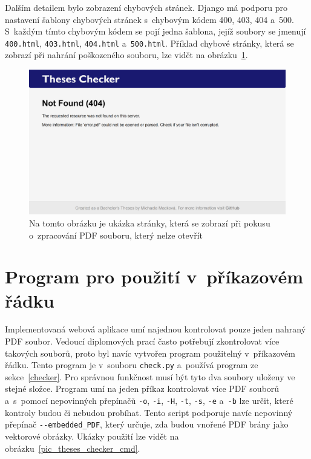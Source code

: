 Dalším detailem bylo zobrazení chybových stránek. Django má podporu pro nastavení
šablony chybových stránek s~chybovým kódem 400, 403, 404 a~500. S~každým tímto
chybovým kódem se pojí jedna šablona, jejíž soubory se jmenují \texttt{400.html},
\texttt{403.html}, \texttt{404.html} a~\texttt{500.html}. Příklad chybové
stránky, která se zobrazí při nahrání poškozeného souboru, lze vidět na
obrázku~\ref{pic_theses_checker_error}.

\begin{figure}[H]
    \centering
    \includegraphics[width=\linewidth]{obrazky-figures/screenshot-error.png}
    \caption{
        Na tomto obrázku je ukázka stránky, která se zobrazí při pokusu o~zpracování
        PDF souboru, který nelze otevřít
    }
    \label{pic_theses_checker_error}
\end{figure}



\section{Program pro použití v~příkazovém řádku}

Implementovaná webová aplikace umí najednou kontrolovat pouze jeden nahraný PDF
soubor. Vedoucí diplomových prací často potřebují zkontrolovat více takových
souborů, proto byl navíc vytvořen program použitelný v~příkazovém řádku. 
Tento program je v~souboru \texttt{check.py} a~používá program ze
sekce~\ref{checker}. Pro správnou funkčnost musí být tyto dva soubory uloženy ve
stejné složce. Program umí na jeden příkaz kontrolovat více PDF souborů
a~s~pomocí nepovinných přepínačů \texttt{-o}, \texttt{-i}, \texttt{-H}, 
\texttt{-t}, \texttt{-s}, \texttt{-e} a~\texttt{-b} lze určit, které kontroly
budou či nebudou probíhat. Tento script podporuje navíc nepovinný přepínač
\texttt{-{-}embedded\_PDF}, který určuje, zda budou vnořené PDF brány jako
vektorové obrázky. Ukázky použití lze vidět na 
obrázku~\ref{pic_theses_checker_cmd}.

